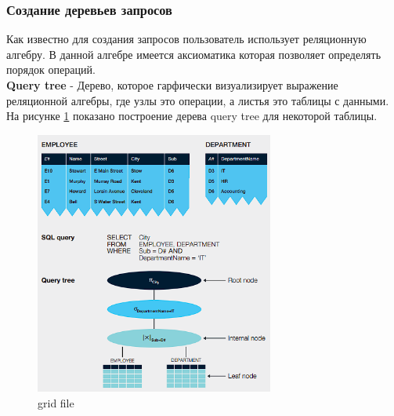 \documentclass{article}
\begin{document}
\subsubsection{Создание деревьев запросов}
Как известно для создания запросов пользователь использует реляционную алгебру. В данной алгебре имеется аксиоматика которая позволяет определять порядок операций.\\
\textbf{Query tree} - Дерево, которое гарфически визуализирует выражение реляционной алгебры, где узлы это операции, а листья это таблицы с данными.\\
На рисунке \ref{img5} показано построение дерева query tree для некоторой таблицы.
\begin{figure}[h]
    \centering
    \includegraphics[width=0.7\textwidth]{images/query_tree.png}
    \caption{grid file}
    \label{img5}
\end{figure}
\end{document}
